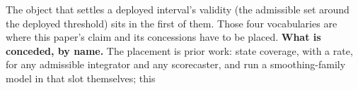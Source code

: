 The object that settles a deployed interval's validity (the admissible set around the deployed
threshold) sits in the first of them. Those four vocabularies are where this paper's claim and
its concessions have to be placed. \textbf{What is conceded, by name.}
The placement is prior work:
\citet[Thm.~1, Prop.~2]{angelopoulos2023pid} state coverage, with a rate, for any admissible
integrator and any scorecaster, and run a smoothing-family model in that slot themselves; this
